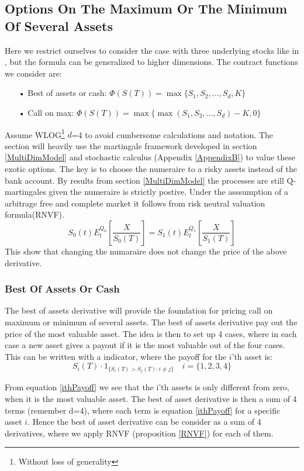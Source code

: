 \subsection{Options On The Maximum Or The Minimum Of Several Assets}
Here we restrict ourselves to consider the case with three underlying stocks like in \parencite{BEG, Ouwehand2006}, but the formula can be generalized to higher dimensions. The contract functions we consider are:
\begin{enumerate}
\item[•] Best of assets or cash: $\Phi(S(T))=\max\{S_1,S_2,\ldots,S_d,K\}$
\item[•] Call on max: $\Phi(S(T))=\max\{\max(S_1,S_2,\ldots,S_d)-K,0\}$
\end{enumerate}
Assume WLOG\footnote{Without loss of generality} $d$=4 to avoid cumbersome calculations and notation. The section will heavily use the martingale framework developed in section \ref{MultiDimModel} and stochastic calculus (Appendix \ref{AppendixB}) to value these exotic options. The key is to choose the numeraire to a risky assets instead of the bank account. By results from section \ref{MultiDimModel} the processes are still Q-martingales given the numeraire is strictly postive. Under the asssumption of a arbitrage free and complete market it follows from risk neutral valuation formula(RNVF).
$$S_0(t)E^{Q_0}_t[\frac{X}{S_0(T)}]=S_1(t)E^{Q_1}_t[\frac{X}{S_1(T)}]$$
This show that changing the numaraire does not change the price of the above derivative.

\subsubsection{Best Of Assets Or Cash}
The best of assets derivative will provide the foundation for pricing call on maximum or minimum of several assets. The best of assets derivative pay out the price of the most valuable asset. The idea is then to set up 4 cases, where in each case a new asset gives a payout if it is the most valuable out of the four cases. This can be written with a indicator, where the payoff for the $i$'th asset is:
\begin{equation}\label{ithPayoff}
S_i(T) \cdot 1_{\{S_i(T)>S_j(T): i\neq j\}} \quad i=\{1,2,3,4\}
\end{equation}

From equation \eqref{ithPayoff} we see that the i'th assets is only different from zero, when it is the most valuable asset. The best of asset derivative is then a sum of 4 terms (remember d=4), where each term is equation \eqref{ithPayoff} for a specific asset $i$. Hence the best of asset derivative can be consider as a sum of 4 derivatives, where we apply RNVF (proposition \ref{RNVF}) for each of them.\\

